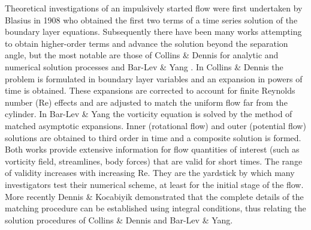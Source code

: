 Theoretical investigations of an impulsively started flow were first undertaken by Blasius in 1908 \cite{blasius1907grenzschichten} who obtained the first two terms of a time series solution of the boundary layer equations.
Subsequently there have been many works attempting to obtain higher-order terms and advance the solution beyond the separation angle, but the most notable are those of Collins \& Dennis \cite{collins1973initial,collins1973flow} for analytic and numerical solution processes and Bar-Lev \& Yang \cite{bar1975initial}.
In Collins \& Dennis the problem is formulated in boundary layer variables and an expansion in powers of time is obtained.
These expansions are corrected to account for finite Reynolds number (Re) effects and are adjusted to match the uniform flow far from the cylinder.
In Bar-Lev \& Yang the vorticity equation is solved by the method of matched asymptotic expansions.
Inner (rotational flow) and outer (potential flow) solutions are obtained to third order in time and a composite solution is formed.
Both works provide extensive information for flow quantities of interest (such as vorticity field, streamlines, body forces) that are valid for short times.
The range of validity increases with increasing Re.
They are the yardstick by which many investigators test their numerical scheme, at least for the initial stage of the flow.
More recently Dennis \& Kocabiyik \cite{dennis1991asymptotic} demonstrated that the complete details of the matching procedure can be established using integral conditions, thus relating the solution procedures of Collins \& Dennis and Bar-Lev \& Yang.

